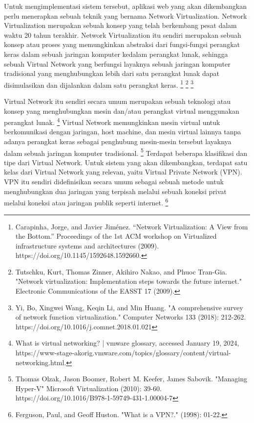 Untuk mengimplementasi sistem tersebut, aplikasi web yang akan dikembangkan perlu menerapkan sebuah teknik yang bernama Network 
Virtualization. Network Virtualization merupakan sebuah konsep yang telah berkembang pesat dalam waktu 20 tahun terakhir. Network 
Virtualization itu sendiri merupakan sebuah konsep atau proses yang memungkinkan abstraksi dari fungsi-fungsi perangkat keras dalam 
sebuah jaringan komputer kedalam perangkat lunak, sehingga sebuah Virtual Network yang berfungsi layaknya sebuah jaringan komputer 
tradisional yang menghubungkan lebih dari satu perangkat lunak dapat disimulasikan dan dijalankan dalam satu perangkat keras. 
\footnote{Carapinha, Jorge, and Javier Jiménez. “Network Virtualization: A View from the Bottom.” Proceedings of the 1st ACM workshop on Virtualized infrastructure systems and architectures (2009). https://doi.org/10.1145/1592648.1592660. }
\footnote{Tutschku, Kurt, Thomas Zinner, Akihiro Nakao, and Phuoc Tran-Gia. "Network virtualization: Implementation steps towards the future internet." Electronic Communications of the EASST 17 (2009).}
\footnote{Yi, Bo, Xingwei Wang, Keqin Li, and Min Huang. "A comprehensive survey of network function virtualization." Computer Networks 133 (2018): 212-262. https://doi.org/10.1016/j.comnet.2018.01.021}
\par

Virtual Network itu sendiri secara umum merupakan sebuah teknologi atau konsep yang menghubungkan mesin dan/atau perangkat virtual 
menggunakan perangkat lunak. 
\footnote{What is virtual networking? | vmware glossary, accessed January 19, 2024, https://www-stage-akorig.vmware.com/topics/glossary/content/virtual-networking.html.} 
Virtual Network memungkinkan mesin virtual untuk berkomunikasi dengan jaringan, host machine, dan mesin virtual lainnya tanpa adanya perangkat keras sebagai penghubung mesin-mesin tersebut layaknya dalam sebuah jaringan komputer tradisional. 
\footnote{Thomas Olzak, Jason Boomer, Robert M. Keefer, James Sabovik. "Managing Hyper-V" Microsoft Virtualization (2010): 39-60. https://doi.org/10.1016/B978-1-59749-431-1.00004-7} 
Terdapat beberapa klasifikasi dan tipe dari Virtual Network. Untuk sistem yang akan dikembangkan, terdapat satu kelas dari Virtual Network yang relevan, yaitu Virtual Private Network (VPN).
VPN itu sendiri didefinisikan secara umum sebagai sebuah metode untuk menghubungkan dua jaringan yang terpisah melalui sebuah koneksi privat melalui koneksi atau jaringan publik seperti internet.
\footnote{Ferguson, Paul, and Geoff Huston. "What is a VPN?." (1998): 01-22.}
\par

